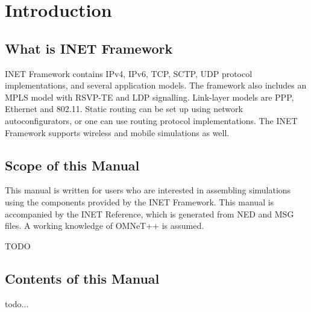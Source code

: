 \chapter{Introduction}
\label{cha:introduction}


\section{What is INET Framework}

INET Framework contains IPv4, IPv6, TCP, SCTP, UDP protocol implementations,
and several application models. The framework also includes an MPLS model
with RSVP-TE and LDP signalling. Link-layer models are PPP, Ethernet and 802.11.
Static routing can be set up using network autoconfigurators, or one can use
routing protocol implementations. The INET Framework supports wireless and
mobile simulations as well.

\section{Scope of this Manual}

This manual is written for users who are interested in assembling
simulations using the components provided by the INET Framework.
This manual is accompanied by the INET Reference, which is generated from 
NED and MSG files. A working knowledge of OMNeT++ is assumed.

\ifdraft TODO
\section{Contents of this Manual}

todo...
\fi



